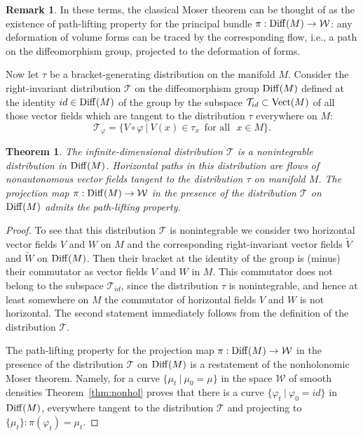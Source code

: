 \documentclass[11pt]{article}
\newtheorem{theorem}[lemma]{Theorem}
\theoremstyle{definition}
\newtheorem{remark}[lemma]{Remark}
\begin{document}
\begin{remark}
In these terms, the classical Moser theorem  can be thought of as the
existence of path-lifting property for the principal bundle $\pi: {\rm Diff}(M)\to \mathcal W$: any
deformation of volume forms can be traced by the corresponding flow, i.e.,
a path on the diffeomorphism group, projected to the deformation of forms. 
\end{remark}



\medskip

Now let $\tau$ be a bracket-generating distribution on the manifold $M$. Consider the
right-invariant distribution $\mathcal T$ on the diffeomorphism group ${\rm Diff}(M)$  defined at the
identity $id \in {\rm Diff}(M)$ of the group by the subspace  ${\mathcal T}_{id}\subset {\rm Vect}(M) $ of all those vector fields
which are tangent to the distribution $\tau$ everywhere on $M$:
$$
{\mathcal T}_\varphi = \{V \circ \varphi~|~ V (x)\in \tau_x \,{\text{ for all }}\,\,  x \in M\}.
$$

\begin{theorem}\label{thm:path}
    The infinite-dimensional distribution $\mathcal T$ is a nonintegrable
distribution in $ {\rm Diff}(M)$. Horizontal paths in this distribution are flows of
nonautonomous vector fields tangent to the distribution $\tau$  on manifold $M$.
The projection map $\pi: {\rm Diff}(M)\to \mathcal W$  in the presence
of the distribution $\mathcal T$ on ${\rm Diff}(M)$ admits the path-lifting property.
\end{theorem}

\begin{proof}
To see that this  distribution $\mathcal T$ is nonintegrable we consider two horizontal
vector fields $V$ and $W$ on $M$ and the corresponding right-invariant
vector fields $\widetilde V$ and $\widetilde W$ on ${\rm Diff}(M)$. Then their bracket 
at the identity of the group is (minus) their commutator as vector fields $V$ and $W$ in $M$. This commutator
does not belong to the subspace ${\mathcal T}_{id}$, since the distribution $\tau$ is nonintegrable,
and hence at least somewhere on $M$ the commutator of horizontal fields $V$
and $W$ is not horizontal. The second statement immediately follows from the definition of the distribution ${\mathcal T}$.

The path-lifting property for the projection map $\pi: {\rm Diff}(M)\to \mathcal W$  in the presence
of the distribution $\mathcal T$ on ${\rm Diff}(M)$ is 
a restatement of the nonholonomic Moser theorem.  Namely, for a curve
$\{\mu_t~|~\mu_0 =\mu\}$ in the space $\mathcal W$ of smooth densities Theorem~\ref{thm:nonhol} proves that
there is a curve $\{\varphi_t~|~\varphi_0 = id\}$ in  ${\rm Diff}(M)$, everywhere tangent to the distribution
$\mathcal T$ and projecting to $\{\mu_t\}: \pi(\varphi_t) = \mu_t$.    
\end{proof}
\end{document}
